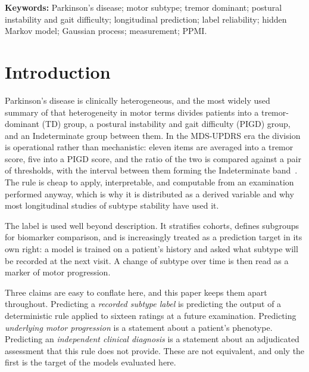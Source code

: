 \documentclass[11pt]{article}
\begin{document}
\medskip
\noindent\textbf{Keywords:} Parkinson's disease; motor subtype; tremor dominant;
postural instability and gait difficulty; longitudinal prediction; label
reliability; hidden Markov model; Gaussian process; measurement; PPMI.

\clearpage
\tableofcontents
\clearpage

\section{Introduction}

Parkinson's disease is clinically heterogeneous, and the most widely used
summary of that heterogeneity in motor terms divides patients into a
tremor-dominant (TD) group, a postural instability and gait difficulty (PIGD)
group, and an Indeterminate group between them. In the MDS-UPDRS era the
division is operational rather than mechanistic: eleven items are averaged into
a tremor score, five into a PIGD score, and the ratio of the two is compared
against a pair of thresholds, with the interval between them forming the
Indeterminate band~\citep{stebbins2013,goetz2008}. The rule is cheap to apply,
interpretable, and computable from an examination performed anyway, which is why
it is distributed as a derived variable and why most longitudinal studies of
subtype stability have used it.

The label is used well beyond description. It stratifies cohorts, defines
subgroups for biomarker comparison, and is increasingly treated as a prediction
target in its own right: a model is trained on a patient's history and asked
what subtype will be recorded at the next visit. A change of subtype over time
is then read as a marker of motor progression.

Three claims are easy to conflate here, and this paper keeps them apart
throughout. Predicting a \emph{recorded subtype label} is predicting the output
of a deterministic rule applied to sixteen ratings at a future examination.
Predicting \emph{underlying motor progression} is a statement about a patient's
phenotype. Predicting an \emph{independent clinical diagnosis} is a statement
about an adjudicated assessment that this rule does not provide. These are not
equivalent, and only the first is the target of the models evaluated here.
\end{document}
